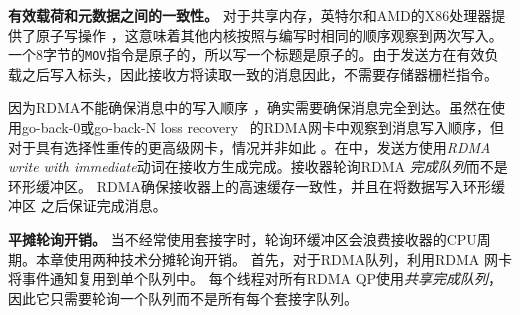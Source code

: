 

\textbf {有效载荷和元数据之间的一致性。}
对于共享内存，英特尔和AMD的X86处理器提供了原子写操作 \cite {sewell2010x86,intel-manual}，这意味着其他内核按照与编写时相同的顺序观察到两次写入。一个8字节的\texttt {MOV}指令是原子的，所以写一个标题是原子的。由于发送方在有效负载之后写入标头，因此接收方将读取一致的消息因此，不需要存储器栅栏指令。

因为RDMA不能确保消息中的写入顺序 \cite {infiniband2000infiniband}，确实需要确保消息完全到达。虽然在使用go-back-0或go-back-N loss recovery~ \cite {dragojevic2014farm}的RDMA网卡中观察到消息写入顺序，但对于具有选择性重传的更高级网卡，情况并非如此 \cite {mprdma,mittal2018revisiting} 。在\libipc {}中，发送方使用\textit {RDMA write with immediate}动词在接收方生成完成。接收器轮询RDMA \emph {完成队列}而不是环形缓冲区。 RDMA确保接收器上的高速缓存一致性，并且在将数据写入\libipc {}环形缓冲区 \cite {infiniband2000infiniband}之后保证完成消息。


\textbf {平摊轮询开销。}
当不经常使用套接字时，轮询环缓冲区会浪费接收器的CPU周期。本章使用两种技术分摊轮询开销。
首先，对于RDMA队列，利用RDMA 网卡将事件通知复用到单个队列中。
每个线程对所有RDMA QP使用\emph {共享完成队列}，因此它只需要轮询一个队列而不是所有每个套接字队列。


